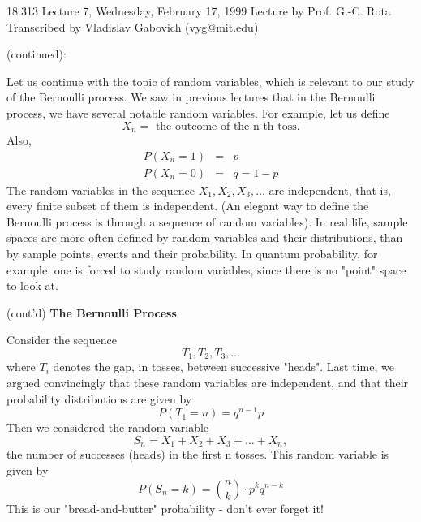 {\Large 18.313 Lecture 7, Wednesday, February 17, 1999}\newline
{\large Lecture by Prof. G.-C. Rota}\newline
Transcribed by Vladislav Gabovich (vyg@mit.edu)\newline

 (continued):

Let us continue with the topic of random variables, which is relevant
to our study of the Bernoulli process.
We saw in previous lectures that in the Bernoulli process, we have
several notable random variables.
For example, let us define
\begin{equation}
X_{n} = \mbox{ the outcome of the n-th toss.}
\end{equation}
Also,
\begin{eqnarray*}
P(X_{n}=1) &=& p  \\
P(X_{n}=0) &=& q=1-p
\end{eqnarray*}
The random variables in the sequence $X_{1},X_{2},X_{3},\ldots$ are
independent, that is, every finite subset of them is independent.
(An elegant way to define the Bernoulli process is through a
sequence of random variables).
In real life, sample spaces are more often defined by random variables
and their distributions, than by sample points, events and their
probability. In quantum probability, for example, one is forced to
study random variables, since there is no "point" space to look at. 

\noindent (cont'd) {\bf The Bernoulli Process }

Consider the sequence
\begin{equation}
T_{1},T_{2},T_{3}, \ldots
\end{equation}
where $T_{i}$ denotes the gap, in tosses, between successive "heads".
Last time, we argued convincingly that these random variables are
independent, and that their probability distributions are given by
\begin{equation}
P(T_{1}=n)=q^{n-1}p
\end{equation}
Then we considered the random variable
\begin{equation}
S_{n}= X_{1}+X_{2}+X_{3}+\ldots+X_{n},
\end{equation}
the number of successes (heads) in the first n tosses.
This random variable is given by
\begin{equation}
P(S_{n}=k)= {n \choose k} \cdot p^{k}q^{n-k}
\end{equation}
This is our "bread-and-butter" probability - don't ever forget it!

